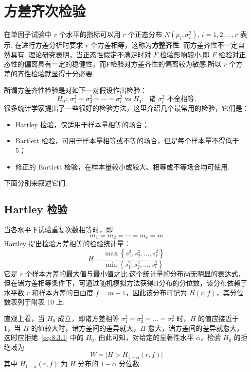 \section{方差齐次检验}\label{sec:8.3}
在单因子试验中 $r$ 个水平的指标可以用 $r$ 个正态分布 $N(\mu_i,\sigma_i^2)$, $i=1,2,\ldots,r$ 表示. 在进行方差分析时要求 $r$ 个方差相等，这称为\textbf{方整齐性}. 而方差齐性不一定自然具有. 理论研究表明，当正态性假定不满足时对 $F$ 检验影响较小,即 $F$ 检验对正态性的偏离具有一定的稳健性，而F检验对方差齐性的偏离较为敏感.所以 $r$ 个方差的齐性检验就显得十分必要.

所谓方差齐性检验是对如下一对假设作出检验：
\begin{equation}\label{eq:8.3.1}
  H_0:\; \sigma_1^2 = \sigma_2^2 = \cdots = \sigma_r^2 \text{ vs } H_1:\; \text{ 诸 } \sigma_i^2 \text{ 不全相等}.
\end{equation}
很多统计学家提出了一些很好的检验方法，这里介绍几个最常用的检验，它们是：
\begin{itemize}
  \item Hartley 检验，仅适用于样本量相等的场合；
  \item Bartlett 检验，可用于样本量相等或不等的场合，但是每个样本量不得低于5；
  \item 修正的 Bartlett 检验，在样本量较小或较大、相等或不等场合均可使用.
\end{itemize}

下面分别来叙述它们.
\subsection{Hartley 检验}

当各水平下试验重复次数相等时，即
\begin{equation*}
  m_{1}=m_{2}=\cdots=m_{r}=m
\end{equation*}
Hartley 提出检验方差相等的检验统计量：
\begin{equation}\label{eq:8.3.2}
  H=\frac{\max \left\{s_{1}^{2}, s_{2}^{2}, \ldots, s_{r}^{2}\right\}}{\min \left\{s_{1}^{2}, s_{2}^{2}, \ldots, s_{r}^{2}\right\}}
\end{equation}
它是 $r$ 个样本方差的最大值与最小值之比.这个统计量的分布尚无明显的表达式，但在诸方差相等条件下，可通过随机模拟方法获得H分布的分位数，该分布依赖于水平数 $r$ 和样本方差的自由度 $f=m-1$，因此该分布可记为 $H(r,f)$，其分位数表列于附表 10 上.

直观上看，当 $H_0$ 成立，即诸方差相等 $\sigma_1^2 = \sigma_2^2= \ldots = \sigma_r^2$ 时，$H$ 的值应接近于1，当 $H$ 的值较大时，诸方差间的差异就大，$H$ 愈大，诸方差间的差异就愈大，这时应拒绝~\eqref{eq:8.3.1} 中的 $H_0$. 由此可知，对给定的显著性水平 $\alpha$，检验 $H_0$ 的拒绝域为
\begin{equation}
  W=|H>H_{1-\alpha}(r, f)|
\end{equation}
其中 $H_{1-\alpha}(r,f)$ 为 $H$ 分布的 $1-\alpha$ 分位数.

